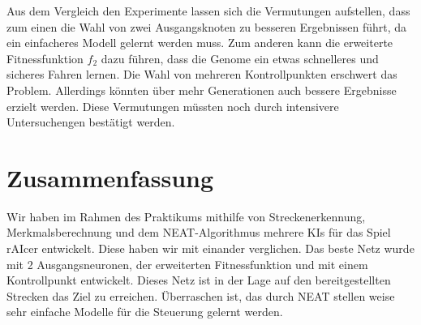 \documentclass[11pt,final,journal,a4paper,towside,towcolumn]{IEEEtran}
\begin{document}
Aus dem Vergleich den Experimente lassen sich die Vermutungen aufstellen, dass zum einen die Wahl von zwei Ausgangsknoten zu besseren Ergebnissen führt, da ein einfacheres Modell gelernt werden muss. Zum anderen kann die erweiterte Fitnessfunktion $f_2$ dazu führen, dass die Genome ein etwas schnelleres und sicheres Fahren lernen. Die Wahl von mehreren Kontrollpunkten erschwert das Problem. Allerdings könnten über mehr Generationen auch bessere Ergebnisse erzielt werden. Diese Vermutungen müssten noch durch intensivere Untersuchengen bestätigt werden.

\section{Zusammenfassung}
Wir haben im Rahmen des Praktikums mithilfe von Streckenerkennung, Merkmalsberechnung und dem \ac{NEAT}-Algorithmus mehrere \acp{KI} für das Spiel rAIcer entwickelt. Diese haben wir mit einander verglichen. Das beste Netz wurde mit 2 Ausgangsneuronen, der erweiterten Fitnessfunktion und mit einem Kontrollpunkt entwickelt. Dieses Netz ist in der Lage auf den bereitgestellten Strecken das Ziel zu erreichen. Überraschen ist, das durch \ac{NEAT} stellen weise sehr einfache Modelle für die Steuerung gelernt werden.
{}

\end{document}
